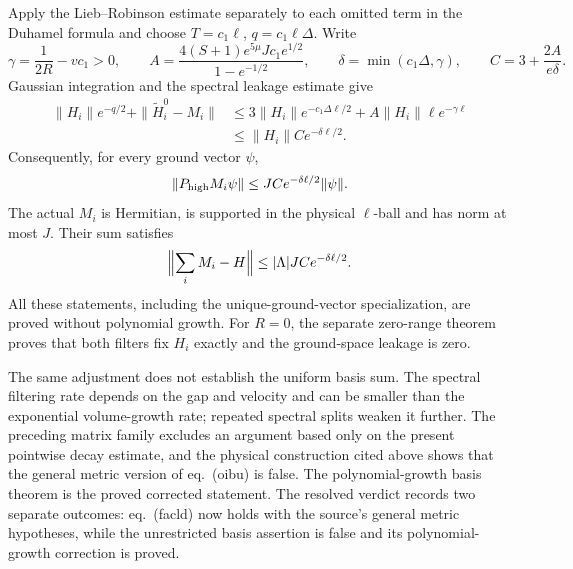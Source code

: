 \documentclass{article}
\begin{document}
Apply the Lieb--Robinson estimate separately to each omitted term in the
Duhamel formula and choose $T=c_1\ell$, $q=c_1\ell\Delta$. Write
\[
 \gamma=\frac1{2R}-vc_1>0,\qquad
 A=\frac{4(S+1)e^{5\mu}Jc_1e^{1/2}}{1-e^{-1/2}},\qquad
 \delta=\min(c_1\Delta,\gamma),\qquad
 C=3+\frac{2A}{e\delta}.
\]
Gaussian integration and the spectral leakage estimate give
\begin{align*}
 \|H_i\|e^{-q/2}+\|\widetilde H_i^0-M_i\|
 &\le 3\|H_i\|e^{-c_1\Delta\ell/2}
       +A\|H_i\|\ell e^{-\gamma\ell}\\
 &\le \|H_i\|C e^{-\delta\ell/2}.
\end{align*}
Consequently, for every ground vector $\psi$,
\[
 \|P_{\rm high}M_i\psi\|
 \le JC e^{-\delta\ell/2}\|\psi\|.
\]
The actual $M_i$ is Hermitian, is supported in the physical $\ell$-ball and
has norm at most $J$. Their sum satisfies
\[
 \Bigl\|\sum_iM_i-H\Bigr\|\le |\Lambda|JC e^{-\delta\ell/2}.
\]
All these statements, including the unique-ground-vector specialization,
are proved without polynomial growth. For $R=0$, the separate zero-range
theorem proves that both filters fix $H_i$ exactly and the ground-space
leakage is zero.

The same adjustment does not establish the uniform basis sum. The spectral
filtering rate depends on the gap and velocity and can be smaller than the
exponential volume-growth rate; repeated spectral splits weaken it further.
The preceding matrix family excludes an argument based only on the present
pointwise decay estimate, and the physical construction cited above shows
that the general metric version of eq.~(oibu) is false. The polynomial-growth
basis theorem is the proved corrected statement. The resolved verdict records
two separate outcomes: eq.~(facld) now holds with the source's general metric
hypotheses, while the unrestricted basis assertion is false and its
polynomial-growth correction is proved.



\end{document}
